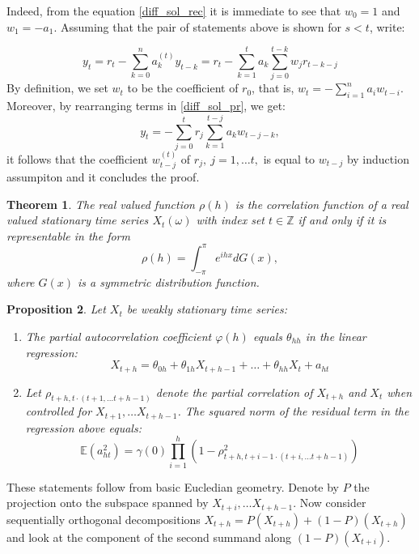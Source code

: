 \documentclass[12pt]{article}
\newtheorem{theorem}{Theorem}[section]
\newtheorem{proposition}[theorem]{Proposition}
\theoremstyle{definition}
\theoremstyle{remark}
\numberwithin{equation}{section}
\newcommand{\ZZ}{\mathbb{Z}}
\newcommand{\EE}{\mathbb{E}}
\begin{document}
Indeed, from the equation \ref{diff_sol_rec} it is immediate to see that $w_0 = 1$ and $w_1 = -a_1$. Assuming that the pair of statements above is shown for $s < t$, write:

\begin{equation}\label{diff_sol_pr}
	y_t = r_t - \sum_{k = 0}^{n}a_k^{(t)}y_{t-k}=r_t - \sum_{k = 1}^{t}a_k\sum_{j = 0}^{t - k} w_jr_{t - k - j}
\end{equation}
By definition, we set $w_t$ to be the coefficient of $r_0$, that is,  $w_t = - \sum_{i = 1}^n a_iw_{t-i}$. Moreover, by rearranging terms in \ref{diff_sol_pr}, we get:
\begin{equation*}
	y_t = -\sum_{j = 0}^t r_j \sum_{k = 1}^{t-j}{a_k w_{t-j-k}},
\end{equation*}
it follows that the coefficient $w_{t-j}^{(t)}$ of $r_j, \ j = 1, \ldots t,$ is equal to $w_{t-j}$ by induction assumpiton and it concludes the proof.



\begin{theorem}
	The real valued function $\rho(h)$ is the correlation function of a real valued stationary time series $X_t(\omega)$ with index set $t\in\ZZ$ if and only if it is representable in the form
\begin{equation*}
	\rho(h) = \int_{-\pi}^\pi e^{ihx}dG(x),
\end{equation*}
	where $G(x)$ is a symmetric distribution function.
\end{theorem}


\begin{proposition}\label{pac_properties} Let $X_t$ be weakly stationary time series:
	\begin{enumerate}
		\item The partial autocorrelation coefficient $\varphi(h)$ equals $\theta_{hh}$ in the linear regression:
		\begin{equation*}
			X_{t+h} = \theta_{0h} + \theta_{1h}X_{t+h-1} + \ldots + \theta_{hh}X_t + a_{ht}
		\end{equation*}
		\item Let $\rho_{t+h,t\cdot(t+1, \ldots t+h-1)}$ denote the partial correlation of $X_{t+h}$ and $X_t$ when controlled for $X_{t+1}, \ldots X_{t+h-1}$. The squared norm of the residual term in the regression above equals:
		\begin{equation*}
			\EE(a_{ht}^2) = \gamma(0)\prod_{i = 1}^{h}(1-\rho_{t+h, t+i-1\cdot(t+i, \ldots t+h-1)}^2)
		\end{equation*}
	\end{enumerate}
\end{proposition}
\proof These statements follow from basic Eucledian geometry. Denote by $P$ the projection onto the subspace spanned by $X_{t+i}, \ldots X_{t+h-1}$. Now consider sequentially orthogonal decompositions $X_{t+h} = P(X_{t+h}) + (1 - P)(X_{t+h})$ and look at the component of the second summand along $(1 - P)(X_{t+i})$.
\end{document}
